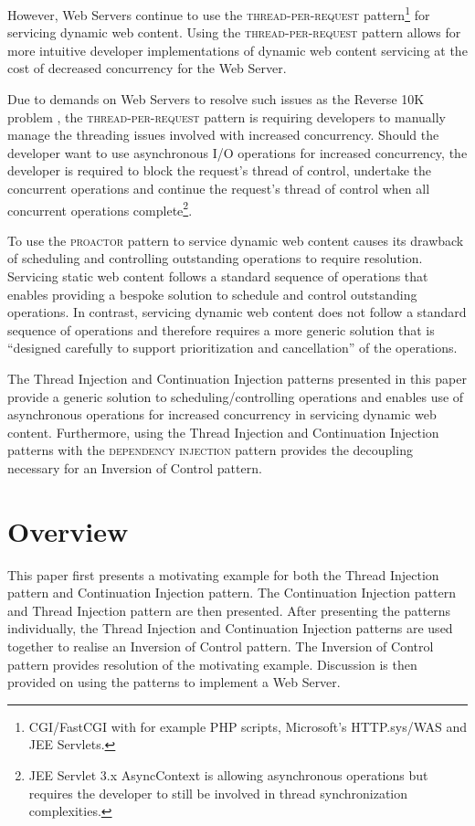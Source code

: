 \documentclass[prodmode]{style/acmlarge}
\begin{document}
However, Web Servers continue to use the \textsc{thread-per-request}
pattern\footnote{CGI/FastCGI with for example PHP scripts, Microsoft's
HTTP.sys/WAS and JEE Servlets.} for servicing dynamic web content.  Using the
\textsc{thread-per-request} pattern allows for more intuitive developer
implementations of dynamic web content servicing at the cost of decreased
concurrency for the Web Server.

Due to demands on Web Servers to resolve such issues as the Reverse 10K problem
\cite{reverse-ten-k-problem}, the \textsc{thread-per-request} pattern is
requiring developers to manually manage the threading issues involved with
increased concurrency.  Should the developer want to use asynchronous I/O
operations for increased concurrency, the developer is required to block the
request's thread of control, undertake the concurrent operations and continue
the request's thread of control when all concurrent operations
complete\footnote{JEE Servlet 3.x AsyncContext is allowing asynchronous
operations but requires the developer to still be involved in thread
synchronization complexities.}.

To use the \textsc{proactor} pattern to service dynamic web content causes its
drawback of scheduling and controlling outstanding operations \cite[p.
8]{proactor} to require resolution.  Servicing static web content follows a
standard sequence of operations that enables providing a bespoke solution to
schedule and control outstanding operations.  In contrast, servicing dynamic web
content does not follow a standard sequence of operations and therefore requires
a more generic solution that is ``designed carefully to support prioritization
and cancellation'' \cite[p. 8]{proactor} of the operations.

The Thread Injection and Continuation Injection patterns presented in this paper
provide a generic solution to scheduling/controlling operations and enables use
of asynchronous operations for increased concurrency in servicing dynamic web
content.  Furthermore, using the Thread Injection and Continuation Injection
patterns with the \textsc{dependency injection} pattern \cite{ioc} provides the
decoupling necessary for an Inversion of Control pattern.


\section{Overview}

This paper first presents a motivating example for both the Thread Injection
pattern and Continuation Injection pattern.  The Continuation Injection pattern
and Thread Injection pattern are then presented.  After presenting the patterns
individually, the Thread Injection and Continuation Injection patterns are used
together to realise an Inversion of Control pattern.  The Inversion of Control
pattern provides resolution of the motivating example.  Discussion is then
provided on using the patterns to implement a Web Server.
\end{document}
